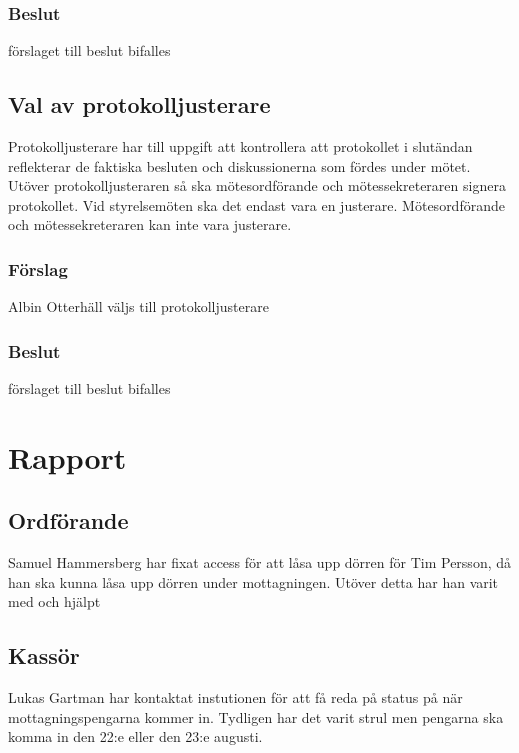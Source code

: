 \documentclass[protokoll]{dvd}
\begin{document}
\subsubsection*{Beslut}
\begin{attsatser}
    \item förslaget till beslut bifalles
\end{attsatser}

\subsection{Val av protokolljusterare}

Protokolljusterare har till uppgift att kontrollera att protokollet i slutändan reflekterar de faktiska besluten och diskussionerna som fördes under mötet.
Utöver protokolljusteraren så ska mötesordförande och mötessekreteraren signera protokollet.
Vid styrelsemöten ska det endast vara en justerare.
Mötesordförande och mötessekreteraren kan inte vara justerare.

\subsubsection*{Förslag}
\begin{attsatser}
    \item Albin Otterhäll väljs till protokolljusterare
\end{attsatser}
\subsubsection*{Beslut}
\begin{attsatser}
    \item förslaget till beslut bifalles
\end{attsatser}

\section{Rapport}
\subsection{Ordförande}
Samuel Hammersberg har fixat access för att låsa upp dörren för Tim Persson, då han ska kunna låsa upp dörren under mottagningen.
Utöver detta har han varit med och hjälpt

\subsection{Kassör}
Lukas Gartman har kontaktat instutionen för att få reda på status på när mottagningspengarna kommer in.
Tydligen har det varit strul men pengarna ska komma in den 22:e eller den 23:e augusti.
\end{document}
